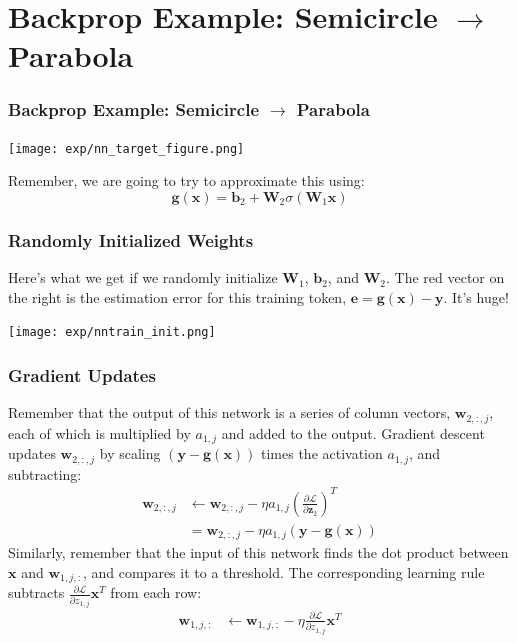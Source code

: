 \documentclass{beamer}
\begin{document}
\section[Example]{Backprop Example: Semicircle $\rightarrow$ Parabola}
\setcounter{subsection}{1}

\begin{frame}
  \frametitle{Backprop Example: Semicircle $\rightarrow$ Parabola}

  \centerline{\texttt{[image: exp/nn\_target\_figure.png]}}

  Remember, we are going to try to approximate this using:
  \[
  \mathbf{g}(\mathbf{x}) = \mathbf{b}_2 + \mathbf{W}_2\sigma\left(\mathbf{W}_1\mathbf{x}\right)
  \]
\end{frame}


\begin{frame}
  \frametitle{Randomly Initialized Weights}

  Here's what we get if we randomly initialize $\mathbf{W}_1$,
  $\mathbf{b}_2$, and $\mathbf{W}_2$.  The red vector on the right is
  the estimation error for this training token,
  $\mathbf{e}=\mathbf{g}(\mathbf{x})-\mathbf{y}$.  It's huge!
  \centerline{\texttt{[image: exp/nntrain\_init.png]}}
\end{frame}


\begin{frame}
  \frametitle{Gradient Updates}

  Remember that the output of this network is a series of column
  vectors, $\mathbf{w}_{2,:,j}$, each of which is multiplied by
  $a_{1,j}$ and added to the output.  Gradient descent updates
  $\mathbf{w}_{2,:,j}$ by scaling
  $(\mathbf{y}-\mathbf{g}(\mathbf{x}))$ times the activation
  $a_{1,j}$, and subtracting:
  \begin{align*}
    \mathbf{w}_{2,:,j}
    &\leftarrow\mathbf{w}_{2,:,j}-\eta a_{1,j}\left(\frac{\partial\mathcal{L}}{\partial\mathbf{z}_2}\right)^T\\
    &=\mathbf{w}_{2,:,j}-\eta a_{1,j}(\mathbf{y}-\mathbf{g}(\mathbf{x}))
  \end{align*}
  Similarly, remember that the input of this network finds the dot
  product between $\mathbf{x}$ and $\mathbf{w}_{1,j,:}$, and compares
  it to a threshold. The corresponding learning rule subtracts
  $\frac{\partial\mathcal{L}}{\partial{z}_{1,j}}\mathbf{x}^T$ from each
  row:
  \begin{align*}
    \mathbf{w}_{1,j,:} &\leftarrow\mathbf{w}_{1,j,:}-\eta
    \frac{\partial\mathcal{L}}{\partial z_{1,j}}\mathbf{x}^T
  \end{align*}
\end{frame}
\end{document}
